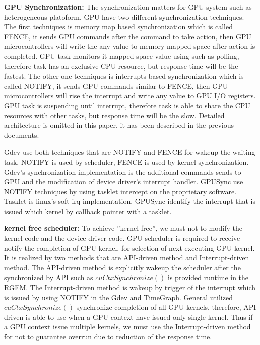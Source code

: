 

\textbf{GPU Synchronization:}
The synchronization matters for GPU system such as heterogeneous platoform.
GPU have two different synchronization techniques.
The first techniques is memory map based synchronization which is called FENCE,
it sends GPU commands after the command to take action,
then GPU microcontrollers will write the any value to memory-mapped space after action is completed.
GPU task monitors it mapped space value using such as polling,
therefore task has an exclusive CPU resource,
but response time will be the fastest.
The other one techniques is interrupts based synchronization which is called NOTIFY,
it sends GPU commands similar to FENCE,
then GPU microcontrollers will rise the interrupt and write any value to GPU I/O registers.
GPU task is suspending until interrupt,
therefore task is able to share the CPU resources with other tasks,
but response time will be the slow. Detailed architecture is omitted in this paper,
it has been described in the previous documents\cite{kato:timegprah, kato:gdev, fujii:apsys2013}.

Gdev use both techniques that are NOTIFY and FENCE for wakeup the waiting task,
NOTIFY is used by scheduler, FENCE is used by kernel synchronization. 
Gdev’s synchronization implementation is the additional commands sends to GPU and the modification of device driver’s interrupt handler.
GPUSync use NOTIFY techniques by using tasklet intercept\cite{elliott2012robust} on the proprietary software.
Tasklet is linux’s soft-irq implementation.
GPUSync identify the interrupt that is issued which kernel by callback pointer with a tasklet.

\textbf{kernel free scheduler:}
To achieve ”kernel free”,
we must not to modify the kernel code and the device driver code.
GPU scheduler is required to receive notify the completion of GPU kernel, for selection of next executing GPU kernel.
It is realized by two methods that are API-driven method and Interrupt-driven method.
The API-driven method is explicitly wakeup the scheduler after the synchronized by API such as $cuCtxSynchronize()$ is provided runtime in the RGEM.
The Interrupt-driven method is wakeup by trigger of the interrupt which is issued by using NOTIFY in the Gdev and TimeGraph.
General utilized $cuCtxSynchronize()$ synchronize completion of all GPU kernels, therefore, API driven is able to use when a GPU context have issued only single kernel.
Thus if a GPU context issue multiple kernels, we must use the Interrupt-driven method for not to guarantee overrun due to reduction of the response time.

